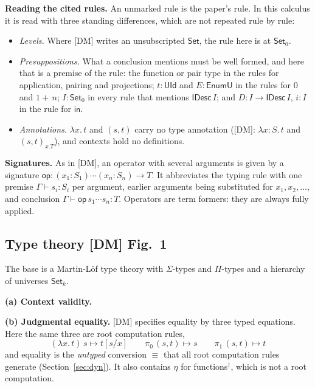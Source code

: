 \documentclass[10pt,a4paper]{article}
\newcommand{\Set}{\mathsf{Set}}
\newcommand{\op}[1]{\mathsf{#1}}
\newcommand{\roll}{\op{in}}
\newcommand{\rn}[1]{{\normalfont\ttfamily\footnotesize\detokenize{#1}}}
\newcommand{\ruleof}[3]{\inferrule*[right={\rn{#1}}]{#2}{#3}}
\newcommand{\rto}{\longmapsto}
\newcommand{\suc}[1]{1{+}\,#1}
\newcommand{\valid}{\op{valid}}
\newcommand{\pz}{\pi_0}
\newcommand{\po}{\pi_1}
\newcommand{\dg}{^{\dagger}}
\newcommand{\DM}{[DM]}
\begin{document}
\textbf{Reading the cited rules.} An unmarked rule is the paper's rule. In
this calculus it is read with three standing differences, which are not
repeated rule by rule:
\begin{itemize}\setlength{\itemsep}{0pt}\setlength{\topsep}{2pt}
\item \emph{Levels.} Where \DM{} writes an unsubscripted $\Set$, the rule
 here is at $\Set_0$.
\item \emph{Presuppositions.} What a conclusion mentions must be well
 formed, and here that is a premise of the rule: the function or pair type in
 the rules for application, pairing and projections; $t:\op{UId}$ and
 $E:\op{EnumU}$ in the rules for $0$ and $\suc{n}$; $I:\Set_0$ in every rule
 that mentions $\op{IDesc}\,I$; and $D:I\to\op{IDesc}\,I$, $i:I$ in the rule
 for $\roll$.
\item \emph{Annotations.} $\lambda x.\,t$ and $(s,t)$ carry no type
 annotation (\DM: $\lambda x{:}S.\,t$ and $(s,t)_{x.T}$), and contexts hold no
 definitions.
\end{itemize}
\textbf{Signatures.} As in \DM, an operator with several arguments is given
by a signature $\op{op}:(x_1{:}S_1)\cdots(x_n{:}S_n)\to T$. It abbreviates
the typing rule with one premise $\Gamma\vdash s_i:S_i$ per argument,
earlier arguments being substituted for $x_1,x_2,\ldots$, and conclusion
$\Gamma\vdash\op{op}\,s_1\cdots s_n:T$. Operators are term formers: they are
always fully applied.

\subsection{Type theory \DM{} Fig.~1}\label{sec:tt}
The base is a Martin-L\"of type theory with $\Sigma$-types and $\Pi$-types
and a hierarchy of universes $\Set_k$.

\textbf{(a) Context validity.}
\textbf{(b) Judgmental equality.} \DM{} specifies equality by three typed
equations. Here the same three are root computation rules,
\[
(\lambda x.\,t)\,s\rto t[s/x]\qquad\pz\,(s,t)\rto s\qquad\po\,(s,t)\rto t
\]
and equality is the \emph{untyped} conversion $\equiv$ that all root
computation rules generate (Section~\ref{sec:dyn}). It also contains
$\eta$ for functions$\dg$, which is not a root computation.
\end{document}

